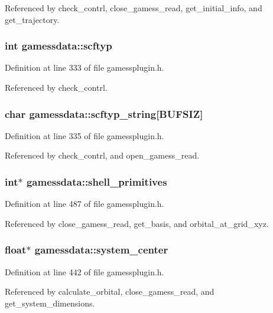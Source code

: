 Referenced by check\_\-contrl, close\_\-gamess\_\-read, get\_\-initial\_\-info, and get\_\-trajectory.
\subsubsection{\setlength{\rightskip}{0pt plus 5cm}int gamessdata::scftyp}\label{structgamessdata_m18}




Definition at line 333 of file gamessplugin.h.

Referenced by check\_\-contrl.
\subsubsection{\setlength{\rightskip}{0pt plus 5cm}char gamessdata::scftyp\_\-string[BUFSIZ]}\label{structgamessdata_m19}




Definition at line 335 of file gamessplugin.h.

Referenced by check\_\-contrl, and open\_\-gamess\_\-read.
\subsubsection{\setlength{\rightskip}{0pt plus 5cm}int$\ast$ gamessdata::shell\_\-primitives}\label{structgamessdata_m65}




Definition at line 487 of file gamessplugin.h.

Referenced by close\_\-gamess\_\-read, get\_\-basis, and orbital\_\-at\_\-grid\_\-xyz.
\subsubsection{\setlength{\rightskip}{0pt plus 5cm}float$\ast$ gamessdata::system\_\-center}\label{structgamessdata_m56}




Definition at line 442 of file gamessplugin.h.

Referenced by calculate\_\-orbital, close\_\-gamess\_\-read, and get\_\-system\_\-dimensions.

